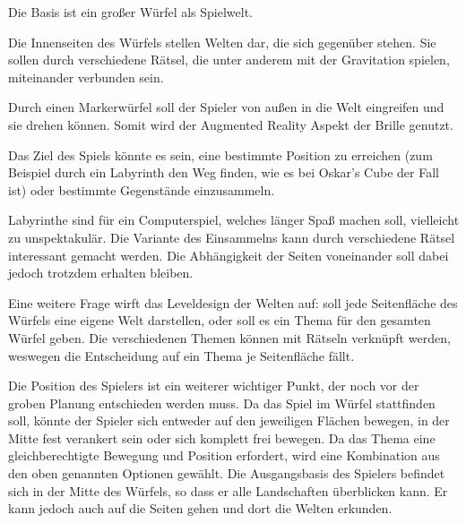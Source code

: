 
Die Basis ist ein großer Würfel als Spielwelt. 

Die Innenseiten des Würfels stellen Welten dar, die sich gegenüber stehen. Sie sollen durch verschiedene Rätsel, die unter anderem mit der Gravitation spielen, miteinander verbunden sein. 

Durch einen Markerwürfel soll der Spieler von außen in die Welt eingreifen und sie drehen können. Somit wird der Augmented Reality Aspekt der Brille genutzt. 

Das Ziel des Spiels könnte es sein, eine bestimmte Position zu erreichen (zum Beispiel durch ein Labyrinth den Weg finden, wie es bei Oskar's Cube der Fall ist) oder bestimmte Gegenstände einzusammeln.
   
Labyrinthe sind für ein Computerspiel, welches länger Spaß machen soll, vielleicht zu unspektakulär. Die Variante des Einsammelns kann durch verschiedene Rätsel interessant gemacht werden. Die Abhängigkeit der Seiten voneinander soll dabei jedoch trotzdem erhalten bleiben.

Eine weitere Frage wirft das Leveldesign der Welten auf: soll jede Seitenfläche des Würfels eine eigene Welt darstellen, oder soll es ein Thema für den gesamten Würfel geben. Die verschiedenen Themen können mit Rätseln verknüpft werden, weswegen die Entscheidung auf ein Thema je Seitenfläche fällt.

Die Position des Spielers ist ein weiterer wichtiger Punkt, der noch vor der groben Planung entschieden werden muss. Da das Spiel im Würfel stattfinden soll, könnte der Spieler sich entweder auf den jeweiligen Flächen bewegen, in der Mitte fest verankert sein oder sich komplett frei bewegen. Da das Thema eine gleichberechtigte Bewegung und Position erfordert, wird eine Kombination aus den oben genannten Optionen gewählt. Die Ausgangsbasis des Spielers befindet sich in der Mitte des Würfels, so dass er alle Landschaften überblicken kann. Er kann jedoch auch auf die Seiten gehen und dort die Welten erkunden.